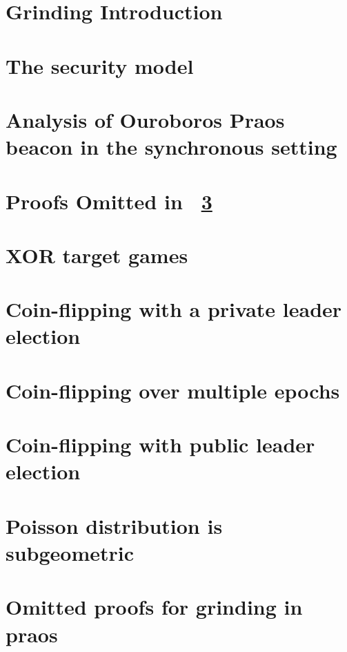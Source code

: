 \chapter{Grinding Introduction }\label{ch:grinding-intro}


\chapter{The security model}\label{sec:model-grinding}


% 

\chapter{Analysis of Ouroboros Praos beacon in the synchronous setting}\label{sec:praos}

\chapter{Proofs Omitted in \Section~\ref{sec:praos}}\label{sec:praos-claims}


\chapter{XOR target games}\label{sec:xor-games}


\chapter{Coin-flipping with a private leader election}\label{sec:coin-tossing}


\chapter{Coin-flipping over multiple epochs}\label{sec:composing-xor-games}\label{sec:beacon}



\chapter{Coin-flipping with public leader election}\label{app:bernoulli}



\chapter{Poisson distribution is subgeometric}\label{app:poisson}


\chapter{Omitted proofs for grinding in praos}\label{app:grinding-praos}

